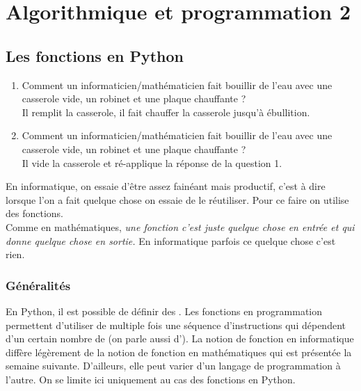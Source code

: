\chapter{Algorithmique et programmation 2}\label{chap_algo2}

\setcounter{section}{2}

\section{Les fonctions en Python}


\begin{remark}
	\begin{enumerate}\textcolor{white}{text}
		\item Comment un informaticien/mathématicien fait bouillir de l'eau avec une casserole vide, un robinet et une plaque chauffante ? \\
		Il remplit la casserole, il fait chauffer la casserole jusqu'à ébullition.
		\item Comment un informaticien/mathématicien fait bouillir de l'eau avec une casserole vide, un robinet et une plaque chauffante ? \\
		Il vide la casserole et ré-applique la réponse de la question 1. 
	\end{enumerate}
\end{remark}

En informatique, on essaie d'être assez fainéant mais productif, c'est à dire lorsque l'on a fait quelque chose on essaie de le réutiliser. Pour ce faire on utilise des fonctions. \\
Comme en mathématiques, \textit{une fonction c'est juste quelque chose en entrée et qui donne quelque chose en sortie.} En informatique parfois ce quelque chose c'est rien. 

\subsection{Généralités}

En Python, il est possible de définir des . Les fonctions en programmation permettent d'utiliser de multiple fois une séquence d'instructions qui dépendent d'un certain nombre de  (on parle aussi d'). La notion de fonction en informatique diffère légèrement de la notion de fonction en mathématiques qui est présentée la semaine suivante. D'ailleurs, elle peut varier d'un langage de programmation à l'autre. On se limite ici uniquement au cas des fonctions en Python.

